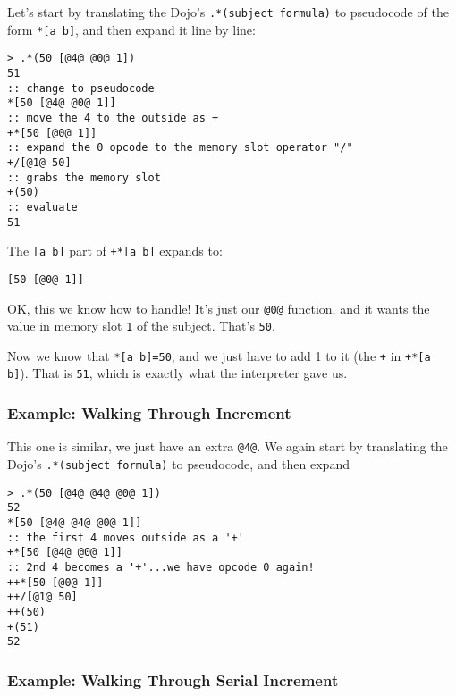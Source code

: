 \documentclass[twoside]{article}
\begin{document}
Let's start by translating the Dojo's \lstinline[style=inlinecode]{.*(subject formula)} to pseudocode of the form \lstinline[style=inlinecode]{*[a b]}, and then expand it line by line:

\begin{lstlisting}[style=listingblock]
> .*(50 [@4@ @0@ 1])
51
:: change to pseudocode
*[50 [@4@ @0@ 1]]
:: move the 4 to the outside as +
+*[50 [@0@ 1]]
:: expand the 0 opcode to the memory slot operator "/"
+/[@1@ 50]
:: grabs the memory slot
+(50)
:: evaluate
51
\end{lstlisting}

\noindent
The \lstinline[style=inlinecode]{[a b]} part of \lstinline[style=inlinecode]{+*[a b]} expands to:

\begin{lstlisting}[style=listingblock]
[50 [@0@ 1]]
\end{lstlisting}

\noindent
OK, this we know how to handle! It's just our \lstinline[style=inlinecode]{@0@} function, and it wants the value in memory slot \lstinline[style=inlinecode]{1} of the subject. That's \lstinline[style=inlinecode]{50}.

Now we know that \lstinline[style=inlinecode]{*[a b]=50}, and we just have to add 1 to it (the \lstinline[style=inlinecode]{+} in \lstinline[style=inlinecode]{+*[a b]}). That is \lstinline[style=inlinecode]{51}, which is exactly what the interpreter gave us.

\subsubsection{Example:  Walking Through Increment}

This one is similar, we just have an extra \lstinline[style=inlinecode]{@4@}. We again start by translating the Dojo's \lstinline[style=inlinecode]{.*(subject formula)} to pseudocode, and then expand

\begin{lstlisting}[style=listingblock]
> .*(50 [@4@ @4@ @0@ 1])
52
*[50 [@4@ @4@ @0@ 1]]
:: the first 4 moves outside as a '+'
+*[50 [@4@ @0@ 1]]
:: 2nd 4 becomes a '+'...we have opcode 0 again!
++*[50 [@0@ 1]]
++/[@1@ 50]
++(50)
+(51)
52
\end{lstlisting}

\subsubsection{Example:  Walking Through Serial Increment}
\end{document}
